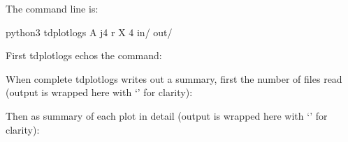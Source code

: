 \documentclass[letterpaper,10pt,english]{sphinxmanual}
\begin{document}
The command line is:

\begin{sphinxVerbatim}[commandchars=\\\{\}]
\PYGZdl{} python3 tdplotlogs \PYGZhy{}A \PYGZhy{}j4 \PYGZhy{}r \PYGZhy{}X 4 in/ out/
\end{sphinxVerbatim}

First tdplotlogs echos the command:

\begin{sphinxVerbatim}[commandchars=\\\{\}]
        
\end{sphinxVerbatim}

When complete tdplotlogs writes out a summary, first the number of files read (output is wrapped here with ‘' for clarity):

\begin{sphinxVerbatim}[commandchars=\\\{\}]
      \PYGZbs{}
         \PYGZbs{}
         \PYGZbs{}
         \PYGZbs{}
         \PYGZbs{}
         
\end{sphinxVerbatim}

Then as summary of each plot in detail (output is wrapped here with ‘' for clarity):
\end{document}
